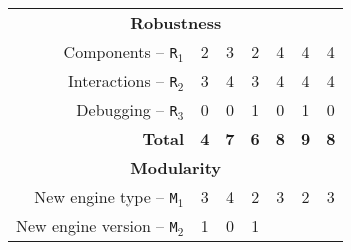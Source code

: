 \documentclass[preprint,3p,twocolumn]{elsarticle}
\begin{document}
\begin{table*}
\begin{tabular}{rcccccc}
\multicolumn{7}{c}{\cellcolor[HTML]{EEEEEE}\textbf{Robustness}}\\
Components  --   \texttt{R$_1$}      & \cellcolor[HTML]{99FF99}2
                                     & \cellcolor[HTML]{99DD99}3
                                     & \cellcolor[HTML]{99FF99}2
                                     & \cellcolor[HTML]{99AA99}4  
                                     & \cellcolor[HTML]{99AA99}4 
                                     & \cellcolor[HTML]{99AA99}4 \\
Interactions -- \texttt{R$_2$}       & \cellcolor[HTML]{99FF99}3    
                                     & \cellcolor[HTML]{99DD99}4
                                     & \cellcolor[HTML]{99DD99}3      
                                     & \cellcolor[HTML]{99AA99}4  
                                     & \cellcolor[HTML]{99AA99}4      
                                     & \cellcolor[HTML]{99AA99}4 \\
Debugging --    \texttt{R$_3$}       & \cellcolor[HTML]{99AA99}0          
                                     & \cellcolor[HTML]{99FF99}0
                                     & \cellcolor[HTML]{99AA99}1
                                     & \cellcolor[HTML]{99FF99}0
                                     & \cellcolor[HTML]{99AA99}1
                                     & \cellcolor[HTML]{99FF99}0 \\
\textbf{Total}                       & \cellcolor[HTML]{99FF99}\textbf{4}
                                     & \cellcolor[HTML]{99CC99}\textbf{7}
                                     & \cellcolor[HTML]{99CC99}\textbf{6}
                                     & \cellcolor[HTML]{99BB99}\textbf{8}
                                     & \cellcolor[HTML]{99AA99}\textbf{9}
                                     & \cellcolor[HTML]{99BB99}\textbf{8} \\
\multicolumn{7}{c}{\cellcolor[HTML]{EEEEEE}\textbf{Modularity}}\\
New engine type -- \texttt{M$_1$}    & \cellcolor[HTML]{99AA99}3
                                     & \cellcolor[HTML]{99DD99}4
                                     & \cellcolor[HTML]{99FF99}2
                                     & \cellcolor[HTML]{99DD99}3
                                     & \cellcolor[HTML]{99DD99}2
                                     & \cellcolor[HTML]{99AA99}3 \\
New engine version -- \texttt{M$_2$} & \cellcolor[HTML]{99AA99}1
                                     & \cellcolor[HTML]{99FF99}0
                                     & \cellcolor[HTML]{99FF99}1

\end{tabular}
\end{table*}
\end{document}
